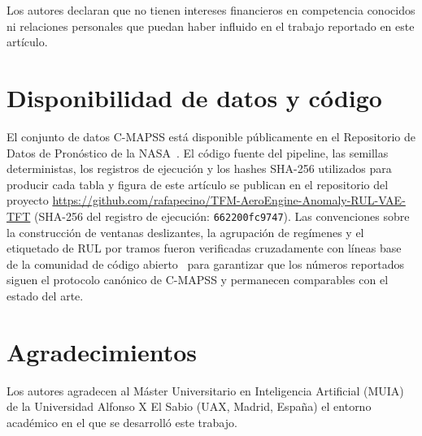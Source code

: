 \documentclass[5p,times,authoryear]{elsarticle}
\begin{document}
Los autores declaran que no tienen intereses financieros en competencia conocidos ni relaciones personales que puedan haber influido en el trabajo reportado en este artículo.

\section*{Disponibilidad de datos y código}

El conjunto de datos C-MAPSS está disponible públicamente en el Repositorio de Datos de Pronóstico de la NASA~\citep{saxena2008damage}. El código fuente del pipeline, las semillas deterministas, los registros de ejecución y los hashes SHA-256 utilizados para producir cada tabla y figura de este artículo se publican en el repositorio del proyecto \url{https://github.com/rafapecino/TFM-AeroEngine-Anomaly-RUL-VAE-TFT} (SHA-256 del registro de ejecución: \texttt{662200fc9747}). Las convenciones sobre la construcción de ventanas deslizantes, la agrupación de regímenes y el etiquetado de RUL por tramos fueron verificadas cruzadamente con líneas base de la comunidad de código abierto~\citep{panara_cmapss_repo,mohyunho_ncmapss_repo} para garantizar que los números reportados siguen el protocolo canónico de C-MAPSS y permanecen comparables con el estado del arte.

\section*{Agradecimientos}

Los autores agradecen al Máster Universitario en Inteligencia Artificial (MUIA) de la Universidad Alfonso X El Sabio (UAX, Madrid, España) el entorno académico en el que se desarrolló este trabajo.



\end{document}
